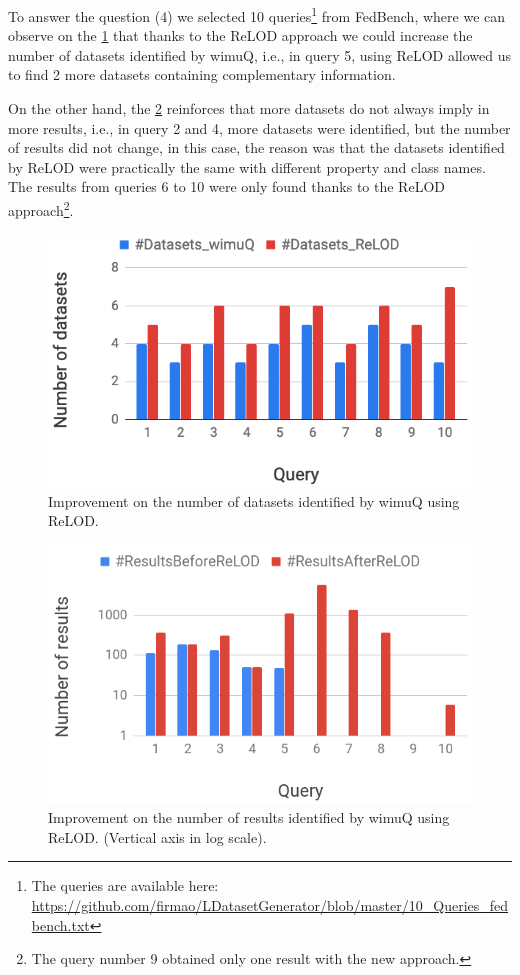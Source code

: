\documentclass[sw]{iosart2x}
\begin{document}
To answer the question (4) we selected 10 queries\footnote{The queries are available here: \url{https://github.com/firmao/LDatasetGenerator/blob/master/10_Queries_fedbench.txt}} from FedBench\cite{fedbench2011}, where we can observe on the \cref{fig:wimuQRelodDatasets} that thanks to the ReLOD approach we could increase the number of datasets identified by wimuQ, i.e., in query 5, using ReLOD allowed us to find 2 more datasets containing complementary information. 

On the other hand, the \cref{fig:wimuQRelodResults} reinforces that more datasets do not always imply in more results, i.e., in query 2 and 4, more datasets were identified, but the number of results did not change, in this case, the reason was that the datasets identified by ReLOD were practically the same with different property and class names. The results from queries 6 to 10 were only found thanks to the ReLOD approach\footnote{The query number 9 obtained only one result with the new approach.}.

\begin{figure}[htb] 
	\centering
	\includegraphics[width=\linewidth]{img/wimuQRelodDatasets.png}
	\caption{Improvement on the number of datasets identified by wimuQ using ReLOD.}
	\label{fig:wimuQRelodDatasets}
\end{figure}

\begin{figure}[htb] 
	\centering
	\includegraphics[width=\linewidth]{img/wimuq_relod_results.png}
	\caption{Improvement on the number of results identified by wimuQ using ReLOD. (Vertical axis in log scale).}
	\label{fig:wimuQRelodResults}
\end{figure}
\end{document}

